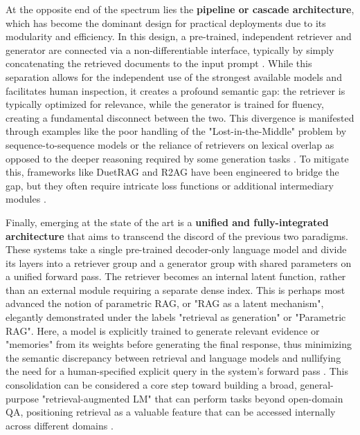 \documentclass[11pt,a4paper]{article}
\begin{document}
At the opposite end of the spectrum lies the \textbf{pipeline or cascade architecture}, which has become the dominant design for practical deployments due to its modularity and efficiency. In this design, a pre-trained, independent retriever and generator are connected via a non-differentiable interface, typically by simply concatenating the retrieved documents to the input prompt \cite{arxiv:2202.01110v2,arxiv:2506.00054v1}. While this separation allows for the independent use of the strongest available models and facilitates human inspection, it creates a profound semantic gap: the retriever is typically optimized for relevance, while the generator is trained for fluency, creating a fundamental disconnect between the two. This divergence is manifested through examples like the poor handling of the "Lost-in-the-Middle" problem by sequence-to-sequence models or the reliance of retrievers on lexical overlap as opposed to the deeper reasoning required by some generation tasks \cite{arxiv:2411.19463v3,arxiv:2410.05983v1,arxiv:2411.19463v3}. To mitigate this, frameworks like DuetRAG and R2AG have been engineered to bridge the gap, but they often require intricate loss functions or additional intermediary modules \cite{arxiv:2507.18910v1}.

Finally, emerging at the state of the art is a \textbf{unified and fully-integrated architecture} that aims to transcend the discord of the previous two paradigms. These systems take a single pre-trained decoder-only language model and divide its layers into a retriever group and a generator group with shared parameters on a unified forward pass. The retriever becomes an internal latent function, rather than an external module requiring a separate dense index. This is perhaps most advanced the notion of parametric RAG, or "RAG as a latent mechanism", elegantly demonstrated under the labels "retrieval as generation" or "Parametric RAG". Here, a model is explicitly trained to generate relevant evidence or "memories" from its weights before generating the final response, thus minimizing the semantic discrepancy between retrieval and language models and nullifying the need for a human-specified explicit query in the system's forward pass \cite{arxiv:2501.15915v1,arxiv:2503.23895v4}. This consolidation can be considered a core step toward building a broad, general-purpose "retrieval-augmented LM" that can perform tasks beyond open-domain QA, positioning retrieval as a valuable feature that can be accessed internally across different domains \cite{arxiv:2403.03187v1}.
\end{document}
